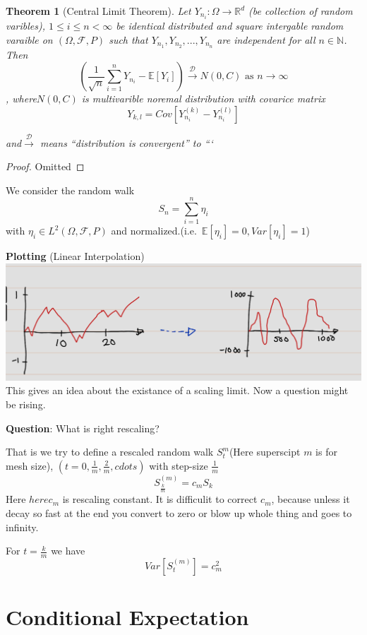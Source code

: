 \documentclass[
]{book}
\newtheorem{theorem}{Theorem}[chapter]
\theoremstyle{definition}
\theoremstyle{definition}
\theoremstyle{definition}
\theoremstyle{definition}
\theoremstyle{remark}
\begin{document}
\begin{theorem}[Central Limit Theorem]
\protect\hypertarget{thm:unnamed-chunk-40}{}\label{thm:unnamed-chunk-40}Let \(Y_{n_i}:\Omega \to \mathbb{R}^d\) (be collection of random varibles), \(1\leq i \leq n < \infty\) be identical distributed and square intergable random varaible on \((\Omega,\mathcal{F},P)\) such that \(Y_{n_1},Y_{n_2},...,Y_{n_n}\) are independent for all \(n\in \mathbb{N}\). Then
\[\left(\frac{1}{\sqrt{n}}\sum_{i=1}^n Y_{n_i}-\mathbb{E}[Y_i] \right)
  \xrightarrow{\mathcal{D}} N(0,C) \text{ as } n \to \infty\],
where\(N(0,C)\) is multivarible noremal distribution with covarice matrix \[Y_{k,l}=Cov[Y^{(k)}_{n_i} -Y^{(l)}_{n_i}]\]

and\(\xrightarrow{\mathcal{D}}\) means ``distribution is convergent'' to ```
\end{theorem}

\begin{proof}
Omitted
\end{proof}

We consider the random walk
\[S_n=\sum_{i=1}^n\eta_i\]
with \(\eta_i\in L^2(\Omega,\mathcal{F},P)\) and normalized.(i.e.~\(\mathbb{E}[\eta_i]=0,Var[\eta_i]=1\))

\textbf{Plotting} (Linear Interpolation)
\includegraphics{fig/fig1.png}
This gives an idea about the existance of a scaling limit. Now a question might be rising.

\textbf{Question}: What is right rescaling?

That is we try to define a rescaled random walk \(S^m_t\)(Here superscipt \(m\) is for mesh size),
\((t=0,\frac{1}{m},\frac{2}{m},cdots)\) with step-size \(\frac{1}{m}\)
\[S_{\frac{k}{m}}^{(m)}=c_mS_k\]
Here \(here c_m\) is rescaling constant. It is difficulit to correct \(c_m\), because unless it decay so fast at the end you convert to zero or blow up whole thing and goes to infinity.

For \(t=\frac{k}{m}\) we have
\[Var[S_t^{(m)}]=c^2_m\]

\chapter{Conditional Expectation}\label{conditional-expectation}
\end{document}
